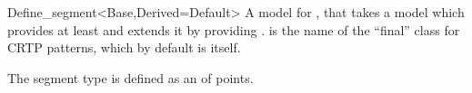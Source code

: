 \begin{ccRefClass}{Define_segment<Base,Derived=Default>}
\ccDefinition
A model for , that takes a  model 
which provides at least  and extends it by providing
.
 is the name of the ``final'' class for CRTP patterns,
which by default is  itself.

\ccIsModel
{}

\ccImplementation
The segment type is defined as an  of points.

\end{ccRefClass}

